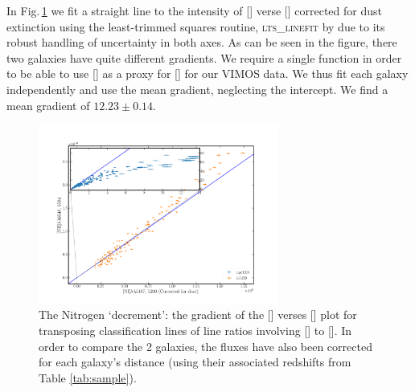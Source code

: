 		In Fig.\,\ref{fig:NII_NI} we fit a straight line to the intensity of [] verse [] corrected for dust extinction using the least-trimmed squares routine, \textsc{lts\_linefit} by \citet{Cappellari2013} due to its robust handling of uncertainty in both axes. As can be seen in the figure, there two galaxies have quite different gradients. We require a single function in order to be able to use [] as a proxy for [] for our VIMOS data. We thus fit each galaxy independently and use the mean gradient, neglecting the intercept. We find a mean gradient of $12.23 \pm 0.14$.

		\begin{figure}
			\centering
			\includegraphics[width=0.7\textwidth]{chapter5/NII_NI_ratio.png}
			\caption[The nitrogen `decrement']{The Nitrogen `decrement': the gradient of the [] verses [] plot for transposing classification lines of line ratios involving [] to []. In order to compare the 2 galaxies, the fluxes have also been corrected for each galaxy's distance (using their associated redshifts from Table \ref{tab:sample}).} 
			\label{fig:NII_NI}
		\end{figure}


